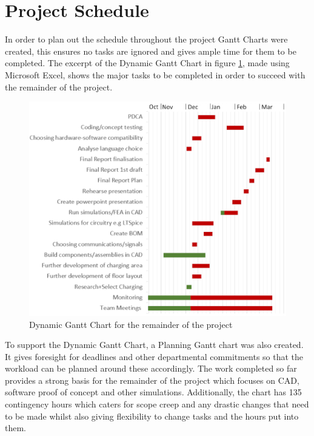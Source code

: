 \documentclass[12pt,titlepage]{article}
\begin{document}
 \FloatBarrier
 
\section{Project Schedule}

In order to plan out the schedule throughout the project Gantt Charts were created, this ensures no tasks are ignored and gives ample time for them to be completed. The excerpt of the Dynamic Gantt Chart in  figure \ref{fig:x}, made using Microsoft Excel, shows the major tasks to be completed in order to succeed with the remainder of the project. 

\begin{figure}[H]
    \centering
        \includegraphics[width=1\linewidth]{GANTT EDITED BY LOUIS.png} %
        \caption{Dynamic Gantt Chart for the remainder of the project}
        \label{fig:x}

\end{figure}
To support the Dynamic Gantt Chart, a Planning Gantt chart was also created. It gives foresight for deadlines and other departmental commitments so that the workload can be planned around these accordingly. The work completed so far provides a strong basis for the remainder of the project which focuses on CAD, software proof of concept and other simulations. Additionally, the  chart has 135 contingency hours which caters for scope creep and any drastic changes that need to be made whilst also giving flexibility to change tasks and the hours put into them. 
\FloatBarrier
\end{document}
